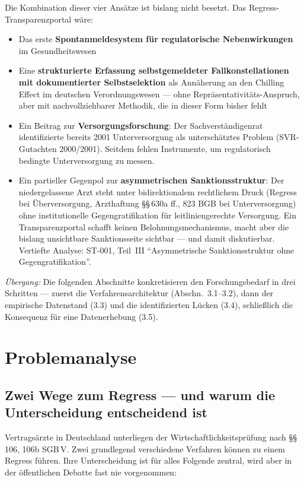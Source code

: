 \documentclass{umbruch-position}
\begin{document}
Die Kombination dieser vier Ansätze ist bislang nicht besetzt. Das Regress-Transparenzportal wäre:
\begin{itemize}[nosep]
\item Das erste \textbf{Spontanmeldesystem für regulatorische Nebenwirkungen} im Gesundheitswesen
\item Eine \textbf{strukturierte Erfassung selbstgemeldeter Fallkonstellationen mit dokumentierter Selbstselektion} als Annäherung an den Chilling Effect im deutschen Verordnungswesen --- ohne Repräsentativitäts-Anspruch, aber mit nachvollziehbarer Methodik, die in dieser Form bisher fehlt
\item Ein Beitrag zur \textbf{Versorgungsforschung}: Der Sachverständigenrat identifizierte bereits 2001 Unterversorgung als unterschätztes Problem (SVR-Gutachten 2000/2001). Seitdem fehlen Instrumente, um regulatorisch bedingte Unterversorgung zu messen.
\item Ein partieller Gegenpol zur \textbf{asymmetrischen Sanktionsstruktur}: Der niedergelassene Arzt steht unter bidirektionalem rechtlichem Druck (Regress bei Überversorgung, Arzthaftung \S\S\,630a ff., 823 BGB bei Unterversorgung) ohne institutionelle Gegengratifikation für leitliniengerechte Versorgung. Ein Transparenzportal schafft keinen Belohnungsmechanismus, macht aber die bislang unsichtbare Sanktionsseite sichtbar --- und damit diskutierbar. Vertiefte Analyse: ST-001, Teil~III ``Asymmetrische Sanktionsstruktur ohne Gegengratifikation''.
\end{itemize}

\textit{Übergang:} Die folgenden Abschnitte konkretisieren den Forschungsbedarf in drei Schritten --- zuerst die Verfahrensarchitektur (Abschn.~3.1--3.2), dann der empirische Datenstand (3.3) und die identifizierten Lücken (3.4), schließlich die Konsequenz für eine Datenerhebung (3.5).


\section{Problemanalyse}

\subsection{Zwei Wege zum Regress --- und warum die Unterscheidung entscheidend ist}

Vertragsärzte in Deutschland unterliegen der Wirtschaftlichkeitsprüfung nach \S\S\,106, 106b SGB\,V. Zwei grundlegend verschiedene Verfahren können zu einem Regress führen. Ihre Unterscheidung ist für alles Folgende zentral, wird aber in der öffentlichen Debatte fast nie vorgenommen:
\end{document}
